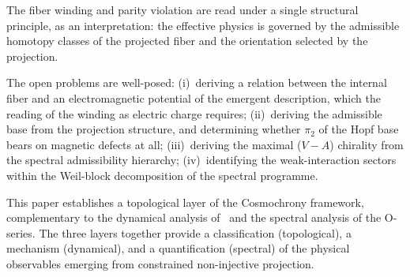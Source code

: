 \documentclass[11pt,a4paper]{article}
\begin{document}
  The fiber winding and parity violation are read under a single
  structural principle, as an interpretation: the effective physics is governed by the admissible homotopy
  classes of the projected fiber and the orientation selected by the
  projection.

  The open problems are well-posed:
  (i)~deriving a relation between the internal fiber and an electromagnetic
  potential of the emergent description, which the reading of the winding as
  electric charge requires;
  (ii)~deriving the admissible base from the projection structure, and
  determining whether $\pi_2$ of the Hopf base bears on magnetic defects at
  all;
  (iii)~deriving the maximal ($V{-}A$) chirality from the spectral
  admissibility hierarchy;
  (iv)~identifying the weak-interaction sectors within the Weil-block
  decomposition of the spectral programme.

  This paper establishes a topological layer of the Cosmochrony
  framework, complementary to the dynamical analysis
  of~\cite{Beau2026e} and the spectral analysis of the O-series.
  The three layers together provide a classification (topological),
  a mechanism (dynamical), and a quantification (spectral) of
  the physical observables emerging from constrained
  non-injective projection.

  
      
\end{document}
